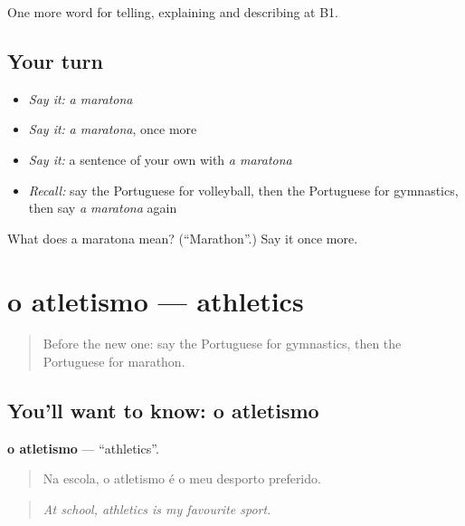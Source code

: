 \begin{grammarlens}[title={What you've built}]
One more word for telling, explaining and describing at B1.
\end{grammarlens}

\subsection*{Your turn}
\begin{itemize}
\raggedright
  \item \emph{Say it:} \emph{a maratona}
  \item \emph{Say it:} \emph{a maratona}, once more
  \item \emph{Say it:} a sentence of your own with \emph{a maratona}
  \item \emph{Recall:} say the Portuguese for volleyball, then the Portuguese for gymnastics, then say \emph{a maratona} again
\end{itemize}

\begin{tcolorbox}[breakable,colback=teal!4,colframe=teal!35!black,title={Before you move on}]
What does a maratona mean? (\textquotedblleft{}Marathon\textquotedblright{}.) Say it once more.
\end{tcolorbox}
\section[o atletismo]{o atletismo — athletics}

\label{lesson:PT-C513-atletismo}



\begin{quote}
Before the new one: say the Portuguese for gymnastics, then the Portuguese for marathon.
\end{quote}

\subsection*{You'll want to know: o atletismo}
\textbf{o atletismo} — \textquotedblleft{}athletics\textquotedblright{}.

\begin{quote}
Na escola, o atletismo é o meu desporto preferido.
\end{quote}

\begin{quote}
\emph{At school, athletics is my favourite sport.}
\end{quote}

